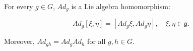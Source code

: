 For every $g \in G$, $Ad_g$ is a Lie algebra homomorphism:

$$Ad_g[\xi, \eta] = [Ad_g \xi, Ad_g \eta], \quad \xi, \eta \in \mathfrak{g}.$$

Moreover, $Ad_{gh} = Ad_g Ad_h$ for all $g, h \in G$.
